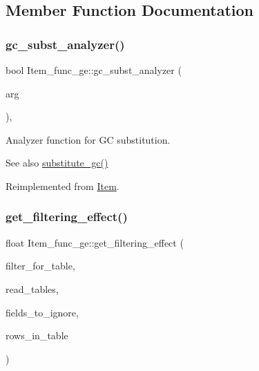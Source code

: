 \subsection{Member Function Documentation}
\mbox{\label{classItem__func__ge_af4066c4cdee18479038378285cdb48cb}} 
\subsubsection{\texorpdfstring{gc\+\_\+subst\+\_\+analyzer()}{gc\_subst\_analyzer()}}
{\footnotesize\ttfamily bool Item\+\_\+func\+\_\+ge\+::gc\+\_\+subst\+\_\+analyzer (\begin{DoxyParamCaption}\item[{uchar $\ast$$\ast$}]{arg }\end{DoxyParamCaption})\hspace{0.3cm}{\ttfamily [inline]}, {\ttfamily [virtual]}}

Analyzer function for GC substitution. \begin{DoxySeeAlso}{See also}
\mbox{\hyperlink{group__Query__Optimizer_gaa95a062cdd785687a638e01d7ad85d11}{substitute\+\_\+gc()}} 
\end{DoxySeeAlso}


Reimplemented from \mbox{\hyperlink{classItem_aea5d6f41e9cd5d17d8e6e8d44bee9c3e}{Item}}.

\mbox{\label{classItem__func__ge_a3614027bdff5ae7d70e2e0178c881e05}} 
\subsubsection{\texorpdfstring{get\+\_\+filtering\+\_\+effect()}{get\_filtering\_effect()}}
{\footnotesize\ttfamily float Item\+\_\+func\+\_\+ge\+::get\+\_\+filtering\+\_\+effect (\begin{DoxyParamCaption}\item[{table\+\_\+map}]{filter\+\_\+for\+\_\+table,  }\item[{table\+\_\+map}]{read\+\_\+tables,  }\item[{const M\+Y\+\_\+\+B\+I\+T\+M\+AP $\ast$}]{fields\+\_\+to\+\_\+ignore,  }\item[{double}]{rows\+\_\+in\+\_\+table }\end{DoxyParamCaption})\hspace{0.3cm}{\ttfamily [virtual]}}

